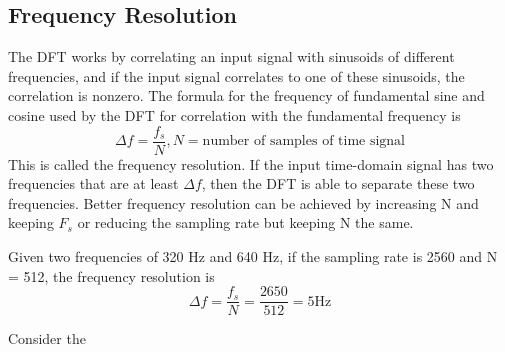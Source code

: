 \documentclass{article}
\begin{document}
\subsection{Frequency Resolution}
The DFT works by correlating an input signal with sinusoids of different frequencies, and if the input signal correlates to one of these sinusoids, the correlation is nonzero. The formula for the frequency of fundamental sine and cosine used by the DFT for correlation with the fundamental frequency is
\begin{equation}
\Delta f=\frac{f_s}{N}, N = \text{number of samples of time signal}
\end{equation}
This is called the frequency resolution. If the input time-domain signal has two frequencies that are at least $\Delta f$, then the DFT is able to separate these two frequencies. Better frequency resolution can be achieved by increasing N and keeping $F_s$ or reducing the sampling rate but keeping N the same.
\begin{center}
Given two frequencies of 320 Hz and 640 Hz, if the sampling rate is 2560 and N = 512, the frequency resolution is \\
$$\Delta f = \frac{f_s}{N}=\frac{2650}{512}=5 \text{Hz}$$
\end{center}
Consider the 
\end{document}
